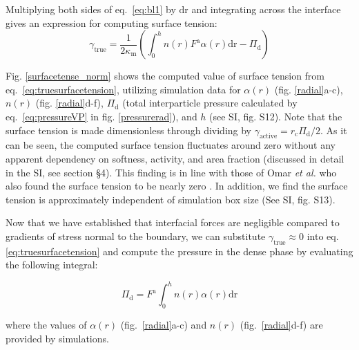 \documentclass[twoside,twocolumn,9pt]{article}
\begin{document}
Multiplying both sides of eq.~\ref{eq:bl1} by $\mathrm{dr}$ and integrating across the interface gives an expression for computing surface tension:
\begin{equation}
    \gamma_\text{true}=\frac{1}{2\kappa_\text{m}}\left(\int_0^h n(r)F^\text{a}\alpha(r)\mathrm{dr} -\Pi_\text{d}\right) 
    \label{eq:truesurfacetension}
\end{equation}

\noindent Fig. \ref{surfacetense_norm} shows the computed value of surface tension from eq.~\ref{eq:truesurfacetension}, utilizing simulation data for $\alpha(r)$ (fig. \ref{radial}a-c), $n(r)$ (fig. \ref{radial}d-f), $\Pi_\text{d}$ (total interparticle pressure calculated by eq.~\ref{eq:pressureVP} in fig. \ref{pressurerad}), and $h$ (see SI, fig. S12). Note that the surface tension is made dimensionless through dividing by $\gamma_\text{active}=r_\text{c}\Pi_\text{d}/2$.
As it can be seen, the computed surface tension fluctuates around zero without any apparent dependency on softness, activity, and area fraction (discussed in detail in the SI, see section \S 4). This finding is in line with those of Omar \textit{et al.} who also found the surface tension to be nearly zero \cite{Omar2020MicroscopicMatter}. In addition, we find the surface tension is approximately independent of simulation box size (See SI, fig. S13). 

Now that we have established that interfacial forces are negligible compared to gradients of stress normal to the boundary, we can substitute $\gamma_\mathrm{true}\approx0$ into eq. \ref{eq:truesurfacetension} and compute the pressure in the dense phase by evaluating the following integral:

\begin{equation}\label{presscont}
\Pi_\mathrm{d}=F^\text{a}\int_0^h n(r)\alpha(r)\mathrm{dr}
\end{equation} 

\noindent where the values of $\alpha(r)$ (fig.~\ref{radial}a-c) and $n(r)$ (fig.~\ref{radial}d-f) are provided by simulations. 
\end{document}
